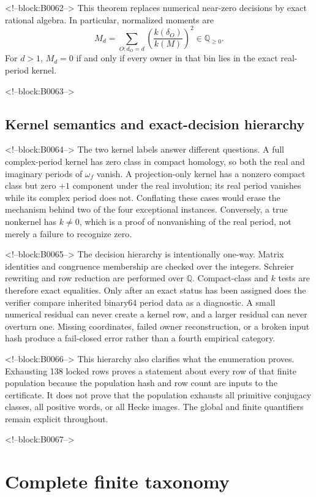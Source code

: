\documentclass[11pt]{article}
\theoremstyle{definition}
\theoremstyle{remark}
\newcommand{\QQ}{\mathbb Q}
\begin{document}
<!--block:B0062-->
This theorem replaces numerical near-zero decisions by exact rational algebra. In particular, normalized moments are
\[
M_d=\sum_{O:d_O=d}\left(\frac{k(\delta_O)}{k(M)}\right)^2\in\QQ_{\geq0}.
\]
For $d>1$, $M_d=0$ if and only if every owner in that bin lies in the exact real-period kernel.

<!--block:B0063-->
\subsection{Kernel semantics and exact-decision hierarchy}

<!--block:B0064-->
The two kernel labels answer different questions. A full complex-period kernel has zero class in compact homology, so both the real and imaginary periods of $\omega_f$ vanish. A projection-only kernel has a nonzero compact class but zero $+1$ component under the real involution; its real period vanishes while its complex period does not. Conflating these cases would erase the mechanism behind two of the four exceptional instances. Conversely, a true nonkernel has $k\neq0$, which is a proof of nonvanishing of the real period, not merely a failure to recognize zero.

<!--block:B0065-->
The decision hierarchy is intentionally one-way. Matrix identities and congruence membership are checked over the integers. Schreier rewriting and row reduction are performed over $\QQ$. Compact-class and $k$ tests are therefore exact equalities. Only after an exact status has been assigned does the verifier compare inherited binary64 period data as a diagnostic. A small numerical residual can never create a kernel row, and a larger residual can never overturn one. Missing coordinates, failed owner reconstruction, or a broken input hash produce a fail-closed error rather than a fourth empirical category.

<!--block:B0066-->
This hierarchy also clarifies what the enumeration proves. Exhausting 138 locked rows proves a statement about every row of that finite population because the population hash and row count are inputs to the certificate. It does not prove that the population exhausts all primitive conjugacy classes, all positive words, or all Hecke images. The global and finite quantifiers remain explicit throughout.

<!--block:B0067-->
\section{Complete finite taxonomy}
\end{document}

